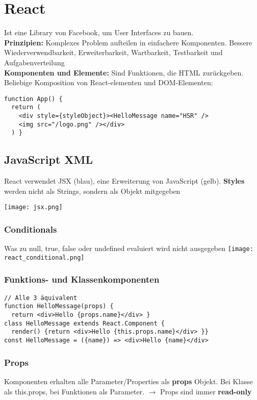 
\section{React}
Ist eine Library von Facebook, um User Interfaces zu bauen.\\
\textcolor{b}{\textbf{Prinzipien:}} Komplexes Problem aufteilen in einfachere Komponenten. Bessere Wiederverwendbarkeit, Erweiterbarkeit, Wartbarkeit, Testbarkeit und Aufgabenverteilung\\
\textcolor{b}{\textbf{Komponenten und Elemente:}} Sind Funktionen, die HTML zurückgeben. Beliebige Komposition von React-elementen und DOM-Elementen:
\begin{lstlisting}[style=htmlcssjs]
function App() {
  return (
    <div style={styleObject}><HelloMessage name="HSR" />
    <img src="/logo.png" /></div>
  ) }
\end{lstlisting}
\subsection{JavaScript XML}
\begin{minipage}{0.4\linewidth}
  React verwendet JSX (blau), eine Erweiterung von JavaScript (gelb). \textbf{Styles} werden nicht als Strings, sondern als Objekt mitgegeben
\end{minipage}
\begin{minipage}{0.6\linewidth}
  \texttt{[image: jsx.png]}
\end{minipage}
\subsubsection{Conditionals}
Was zu null, true, false oder undefined evaluiert wird nicht ausgegeben
\texttt{[image: react\_conditional.png]}
\subsubsection{Funktions- und Klassenkomponenten}
\begin{lstlisting}[style=htmlcssjs]
// Alle 3 äquivalent
function HelloMessage(props) {
  return <div>Hello {props.name}</div> }
class HelloMessage extends React.Component {
  render() {return <div>Hello {this.props.name}</div> }}
const HelloMessage = ({name}) => <div>Hello {name}</div>
\end{lstlisting}
\subsubsection{Props}
Komponenten erhalten alle Parameter/Properties als \textbf{props} Objekt. Bei Klasse als \textcolor{b}{this.props}, bei Funktionen als Parameter. $\rightarrow$ Props sind immer \textbf{read-only}
